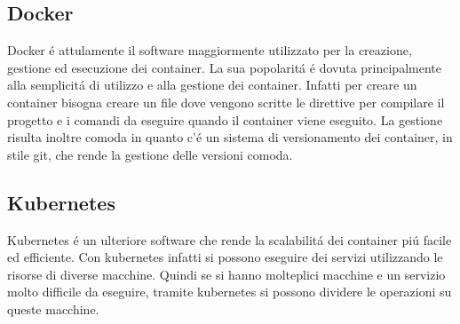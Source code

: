 \subsection{Docker}
\cite{docker}Docker é attulamente il software maggiormente utilizzato per la creazione, gestione ed esecuzione dei container. La sua popolaritá é dovuta principalmente alla semplicitá di utilizzo e alla gestione dei container. Infatti per creare un container bisogna creare un file dove vengono scritte le direttive per compilare il progetto e i comandi da eseguire quando il container viene eseguito. La gestione risulta inoltre comoda in quanto c'é un sistema di versionamento dei container, in stile git, che rende la gestione delle versioni comoda.

\subsection{Kubernetes}
Kubernetes é un ulteriore software che rende la scalabilitá dei container piú facile ed efficiente. Con kubernetes infatti si possono eseguire dei servizi utilizzando le risorse di diverse macchine. Quindi se si hanno molteplici macchine e un servizio molto difficile da eseguire, tramite kubernetes si possono dividere le operazioni su queste macchine.
